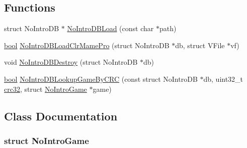 \subsection*{Functions}
\begin{DoxyCompactItemize}
\item 
struct No\+Intro\+DB $\ast$ \mbox{\hyperlink{no-intro_8h_a467dbcef29eb2a06f7b5747e6ee4fddb}{No\+Intro\+D\+B\+Load}} (const char $\ast$path)
\item 
\mbox{\hyperlink{libretro_8h_a4a26dcae73fb7e1528214a068aca317e}{bool}} \mbox{\hyperlink{no-intro_8h_a0ce34503c62adbfd6accf09a9ce89260}{No\+Intro\+D\+B\+Load\+Clr\+Mame\+Pro}} (struct No\+Intro\+DB $\ast$db, struct V\+File $\ast$vf)
\item 
void \mbox{\hyperlink{no-intro_8h_a1a941643f11437a5ef79fc8ef7c4e55e}{No\+Intro\+D\+B\+Destroy}} (struct No\+Intro\+DB $\ast$db)
\item 
\mbox{\hyperlink{libretro_8h_a4a26dcae73fb7e1528214a068aca317e}{bool}} \mbox{\hyperlink{no-intro_8h_a8aa1074ddc85b995d2949c72e356f0d1}{No\+Intro\+D\+B\+Lookup\+Game\+By\+C\+RC}} (const struct No\+Intro\+DB $\ast$db, uint32\+\_\+t \mbox{\hyperlink{util_2crc32_8c_a0bdd14723a2507e6465c44ca5d9dc364}{crc32}}, struct \mbox{\hyperlink{no-intro_8h_struct_no_intro_game}{No\+Intro\+Game}} $\ast$game)
\end{DoxyCompactItemize}


\subsection{Class Documentation}
\label{struct_no_intro_game}
\subsubsection{struct No\+Intro\+Game}


